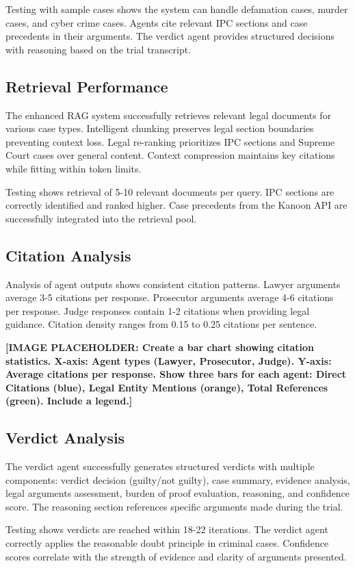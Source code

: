\documentclass[12pt,singleside,a4paper]{article}
\begin{document}
Testing with sample cases shows the system can handle defamation cases, murder cases, and cyber crime cases. Agents cite relevant IPC sections and case precedents in their arguments. The verdict agent provides structured decisions with reasoning based on the trial transcript.

\subsection{Retrieval Performance}
The enhanced RAG system successfully retrieves relevant legal documents for various case types. Intelligent chunking preserves legal section boundaries preventing context loss. Legal re-ranking prioritizes IPC sections and Supreme Court cases over general content. Context compression maintains key citations while fitting within token limits.

Testing shows retrieval of 5-10 relevant documents per query. IPC sections are correctly identified and ranked higher. Case precedents from the Kanoon API are successfully integrated into the retrieval pool.

\subsection{Citation Analysis}
Analysis of agent outputs shows consistent citation patterns. Lawyer arguments average 3-5 citations per response. Prosecutor arguments average 4-6 citations per response. Judge responses contain 1-2 citations when providing legal guidance. Citation density ranges from 0.15 to 0.25 citations per sentence.

\textbf{[IMAGE PLACEHOLDER: Create a bar chart showing citation statistics. X-axis: Agent types (Lawyer, Prosecutor, Judge). Y-axis: Average citations per response. Show three bars for each agent: Direct Citations (blue), Legal Entity Mentions (orange), Total References (green). Include a legend.]}

\subsection{Verdict Analysis}
The verdict agent successfully generates structured verdicts with multiple components: verdict decision (guilty/not guilty), case summary, evidence analysis, legal arguments assessment, burden of proof evaluation, reasoning, and confidence score. The reasoning section references specific arguments made during the trial.

Testing shows verdicts are reached within 18-22 iterations. The verdict agent correctly applies the reasonable doubt principle in criminal cases. Confidence scores correlate with the strength of evidence and clarity of arguments presented.
\end{document}
